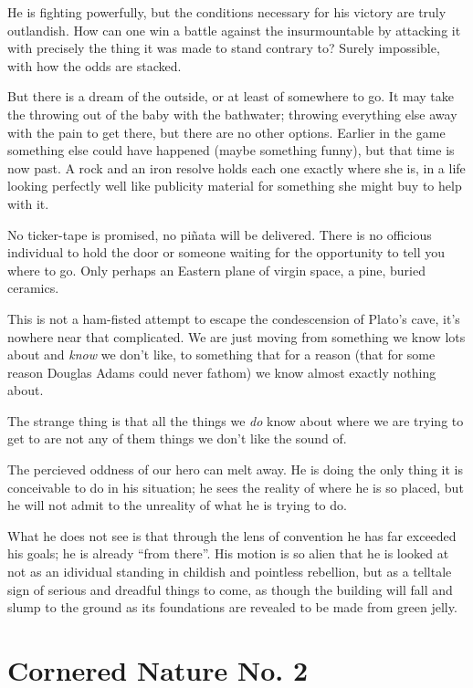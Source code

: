 \documentclass{book}
\begin{document}
He is fighting powerfully, but the conditions necessary for his victory are
truly outlandish. How can one win a battle against the insurmountable by
attacking it with precisely the thing it was made to stand contrary to? Surely
impossible, with how the odds are stacked.

But there is a dream of the outside, or at least of somewhere to go. It may
take the throwing out of the baby with the bathwater; throwing everything else
away with the pain to get there, but there are no other options. Earlier in the
game something else could have happened (maybe something funny), but that time
is now past. A rock and an iron resolve holds each one exactly where she is, in
a life looking perfectly well like publicity material for something she might
buy to help with it.

No ticker-tape is promised, no piñata will be delivered. There is no officious
individual to hold the door or someone waiting for the opportunity to tell you
where to go. Only perhaps an Eastern plane of virgin space, a pine, buried
ceramics.

This is not a ham-fisted attempt to escape the condescension of Plato's cave,
it's nowhere near that complicated.  We are just moving from something we know
lots about and \emph{know} we don't like, to something that for a reason (that
for some reason Douglas Adams could never fathom) we know almost exactly
nothing about.

The strange thing is that all the things we \emph{do} know about where we are
trying to get to are not any of them things we don't like the sound of.

The percieved oddness of our hero can melt away. He is doing the only thing it
is conceivable to do in his situation; he sees the reality of where he is so
placed, but he will not admit to the unreality of what he is trying to do.

What he does not see is that through the lens of convention he has far exceeded
his goals; he is already ``from there''. His motion is so alien that he is
looked at not as an idividual standing in childish and pointless rebellion, but
as a telltale sign of serious and dreadful things to come, as though the
building will fall and slump to the ground as its foundations are revealed to
be made from green jelly.

\chapter{Cornered Nature No. 2}
\end{document}
